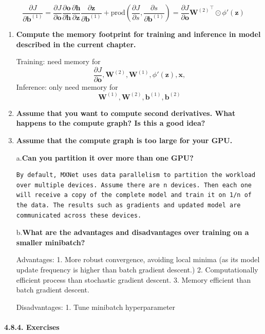 \documentclass[11pt]{article}
\begin{document}
\begin{enumerate}
  \[ \frac{\partial J}{\partial \mathbf{b}^{(1)}}
      = \frac{\partial J}{\partial \mathbf{o}} \frac{\partial \mathbf{o}}{\partial \mathbf{h}} \frac{\partial \mathbf{h}}{\partial \mathbf{z}} \frac{\partial \mathbf{z}}{\partial \mathbf{b}^{(1)}} + \text{prod}\left(\frac{\partial J}{\partial s}, \frac{\partial s}{\partial \mathbf{b}^{(1)}}\right)
      = \frac{\partial J}{\partial \mathbf{o}} {\mathbf{W}^{(2)}}^\top \odot \phi'\left(\mathbf{z}\right)\]
\end{enumerate}

    \begin{enumerate}
\def\labelenumi{\arabic{enumi}.}
\setcounter{enumi}{2}
\item
  \textbf{Compute the memory footprint for training and inference in
  model described in the current chapter.}

  Training: need memory for
  \[ \frac{\partial J}{\partial \mathbf{o}}, {\mathbf{W}^{(2)}}, {\mathbf{W}^{(1)}}, \phi'\left(\mathbf{z}\right), {\mathbf{x}},\]
  Inference: only need memory for
  \[\mathbf{W}^{(1)}, \mathbf{W}^{(2)}, \mathbf{b}^{(1)}, \mathbf{b}^{(2)}\]
\item
  \textbf{Assume that you want to compute second derivatives. What
  happens to the compute graph? Is this a good idea?}
\item
  \textbf{Assume that the compute graph is too large for your GPU.}

  a.\textbf{Can you partition it over more than one GPU?}

\begin{verbatim}
By default, MXNet uses data parallelism to partition the workload over multiple devices. Assume there are n devices. Then each one will receive a copy of the complete model and train it on 1/n of the data. The results such as gradients and updated model are communicated across these devices.
\end{verbatim}

  b.\textbf{What are the advantages and disadvantages over training on a
  smaller minibatch?}

  Advantages: 1. More robust convergence, avoiding local minima (as its
  model update frequency is higher than batch gradient descent.) 2.
  Computationally efficient process than stochastic gradient descent. 3.
  Memory efficient than batch gradient descent.

  Disadvantages: 1. Tune minibatch hyperparameter
\end{enumerate}

    \paragraph{4.8.4. Exercises}\label{exercises}
\end{document}
